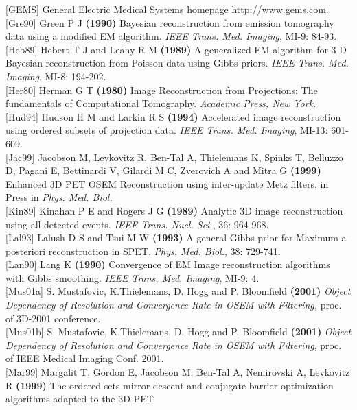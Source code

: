 \documentclass{article}
\begin{document}
{[}GEMS{]} General Electric Medical Systems homepage {\underline {http://www.gems.com}}.\\
{[}Gre90{]} Green P J \textbf{(1990)} Bayesian reconstruction from emission 
tomography data using a modified EM algorithm. \textit{IEEE Trans. 
Med. Imaging}, MI-9: 84-93.\\
{[}Heb89{]} Hebert T J and Leahy R M \textbf{(1989)} A generalized EM 
algorithm for 3-D Bayesian reconstruction from Poisson data using 
Gibbs priors. \textit{IEEE Trans. Med. Imaging}, MI-8: 194-202.\\
{[}Her80{]} Herman G T \textbf{(1980)} Image Reconstruction from Projections: 
The fundamentals of Computational Tomography. \textit{Academic Press, 
New York}.\\
{[}Hud94{]} Hudson H M and Larkin R S \textbf{(1994)} Accelerated image 
reconstruction using ordered subsets of projection data. \textit{IEEE 
Trans. Med. Imaging}, MI-13: 601-609.\\
{[}Jac99{]} Jacobson M, Levkovitz R, Ben-Tal A, Thielemans K, Spinks 
T, Belluzzo D, Pagani E, Bettinardi V, Gilardi M C, Zverovich 
A and Mitra G \textbf{(1999)} Enhanced 3D PET OSEM Reconstruction 
using inter-update Metz filters. in Press in \textit{Phys. Med. Biol.}\\
{[}Kin89{]} Kinahan P E and Rogers J G \textbf{(1989)} Analytic 3D image 
reconstruction using all detected events. \textit{IEEE Trans. Nucl. 
Sci.}, 36: 964-968. \\
{[}Lal93{]} Lalush D S and Tsui M W \textbf{(1993)} A general Gibbs prior 
for Maximum a posteriori reconstruction in SPET. \textit{Phys. Med. 
Biol.}, 38: 729-741.\\
{[}Lan90{]} Lang K \textbf{(1990)} Convergence of EM Image reconstruction 
algorithms with Gibbs smoothing. \textit{IEEE Trans. Med. Imaging}, 
MI-9: 4.\\
{[}Mus01a{]} S. Mustafovic, K.Thielemans, D. Hogg and P. Bloomfield \textbf{(2001)} 
\textit{Object Dependency of Resolution and Convergence Rate in OSEM 
with Filtering,} proc. of 3D-2001 conference.\\
{[}Mus01b{]} S. Mustafovic, K.Thielemans, D. Hogg and P. Bloomfield \textbf{(2001)} \textit{Object 
Dependency of Resolution and Convergence Rate in OSEM with Filtering}, 
proc. of IEEE Medical Imaging Conf. 2001.\\
{[}Mar99{]} Margalit T, Gordon E, Jacobson M, Ben-Tal A, Nemirovski 
A, Levkovitz R \textbf{(1999)} The ordered sets mirror descent and 
conjugate barrier optimization algorithms adapted to the 3D PET 
\end{document}
